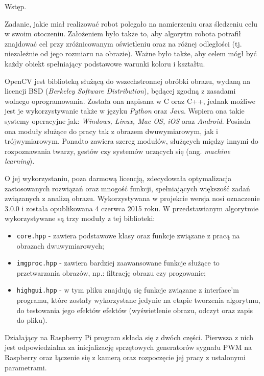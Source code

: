 Wstęp.

Zadanie, jakie miał realizować robot polegało na namierzeniu oraz śledzeniu celu w swoim otoczeniu. Założeniem było także to, aby algorytm robota potrafił znajdować cel przy zróżnicowanym oświetleniu oraz na różnej odległości (tj. niezależnie od jego rozmiaru na obrazie). Ważne było także, aby celem mógł być każdy obiekt spełniający podstawowe warunki koloru i kształtu.

OpenCV jest biblioteką służącą do wszechstronnej obróbki obrazu, wydaną na licencji BSD (\textit{Berkeley Software Distribution}), będącej zgodną z zasadami wolnego oprogramowania. Została ona napisana w C oraz C++, jednak możliwe jest je wykorzystywanie także w języku \textit{Python} oraz \textit{Java}. Wspiera ona takie systemy operacyjne jak: \textit{Windows, Linux, Mac OS, iOS} oraz \textit{Android}. Posiada ona moduły służące do pracy tak z obrazem dwuwymiarowym, jak i trójwymiarowym. Ponadto zawiera szereg modułów, służących między innymi do rozpoznawania twarzy, gestów czy systemów uczących się (ang. \textit{machine learning}).

O jej wykorzystaniu, poza darmową licencją, zdecydowała optymalizacja zastosowanych rozwiązań oraz mnogość funkcji, spełniających większość zadań związanych z analizą obrazu. Wykorzystywana w projekcie wersja nosi oznaczenie 3.0.0 i została opublikowana 4 czerwca 2015 roku. W przedstawianym algorytmie wykorzystywane są trzy moduły z tej biblioteki:
\begin{itemize}
\item \texttt{core.hpp} - zawiera podstawowe klasy oraz funkcje związane z pracą na obrazach dwuwymiarowych;
\item \texttt{imgproc.hpp} - zawiera bardziej zaawansowane funkcje służące to przetwarzania obrazów, np.: filtrację obrazu czy progowanie;
\item \texttt{highgui.hpp} - w tym pliku znajdują się funkcje związane z interface'm programu, które zostały wykorzystane jedynie na etapie tworzenia algorytmu, do testowania jego efektów efektów (wyświetlenie obrazu, odczyt oraz zapis do pliku).
\end{itemize}

Działający na Raspberry Pi program składa się z dwóch części. Pierwsza z nich jest odpowiedzialna za inicjalizację sprzętowych generatorów sygnału PWM na Raspberry oraz łączenie się z kamerą oraz rozpoczęcie jej pracy z ustalonymi parametrami.


